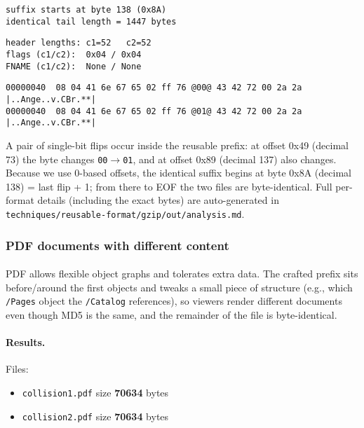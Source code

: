 \documentclass[runningheads]{llncs}
\begin{document}
    \begin{lstlisting}[style=textblock, caption={Identical suffix boundary}, label={lst:gzip-suffix}]
suffix starts at byte 138 (0x8A)
identical tail length = 1447 bytes
    \end{lstlisting}

    \begin{lstlisting}[style=textblock, caption={GZIP headers (parsed)}, label={lst:gziphdr}]
header lengths: c1=52   c2=52
flags (c1/c2):  0x04 / 0x04
FNAME (c1/c2):  None / None
    \end{lstlisting}

    \begin{lstlisting}[style=hexhi, caption={GZIP prefix excerpt (visible flip)}, label={lst:gziphex}]
00000040  08 04 41 6e 67 65 02 ff 76 @00@ 43 42 72 00 2a 2a  |..Ange..v.CBr.**|
00000040  08 04 41 6e 67 65 02 ff 76 @01@ 43 42 72 00 2a 2a  |..Ange..v.CBr.**|
    \end{lstlisting}

    \textit{} A pair of single-bit flips occur inside the reusable prefix: at offset
    0x49 (decimal 73) the byte changes \texttt{00$\rightarrow$01}, and at
    offset 0x89 (decimal 137) also changes. Because
    we use 0-based offsets, the identical suffix begins at byte
    0x8A (decimal 138) = last flip + 1; from there to EOF the two files are
    byte-identical. Full per-format details (including the exact bytes) are
    auto-generated in \texttt{techniques/reusable-format/gzip/out/analysis.md}.

    \subsubsection{PDF documents with different content}

    \paragraph{}
    PDF allows flexible object graphs and tolerates extra data. The crafted prefix sits before/around the first objects and tweaks a small piece of structure (e.g., which \texttt{/Pages} object the \texttt{/Catalog} references), so viewers render different documents even though MD5 is the same, and the remainder of the file is byte-identical.

    \paragraph{Results.}
    Files:
    \begin{itemize}
        \item \texttt{collision1.pdf} size \textbf{70634} bytes
        \item \texttt{collision2.pdf} size \textbf{70634} bytes
    \end{itemize}
\end{document}
